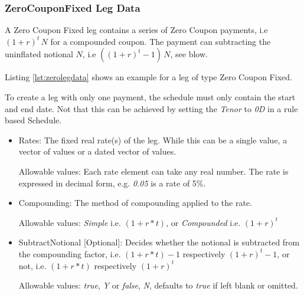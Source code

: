 \subsubsection{ZeroCouponFixed Leg Data}
\label{ss:zerolegdata}

A Zero Coupon Fixed leg contains a series of Zero Coupon payments, i.e $(1 + r)^t \,N$ for a compounded coupon. The payment can subtracting the uninflated notional $N$, i.e $((1 + r)^t-1) \,N$, see blow.

Listing \ref{lst:zerolegdata} shows an example for a leg of type Zero Coupon Fixed. 

To create a leg with only one payment, the schedule must only contain the start and end date. Not that this can be achieved by setting the \emph{Tenor} to \emph{0D} in a rule based Schedule. 

\begin{itemize}
\item Rates: The fixed real rate(s) of the leg. While this can be a single value, a vector of values or a dated vector of
  values. 
 
 Allowable values: Each rate element can take any  real number. The rate is
  expressed in decimal form, e.g. \emph{0.05} is a rate of 5\%.
\item Compounding: The method of compounding applied to the rate.

Allowable values: \emph{Simple} i.e. $(1 + r * t)$, or \emph{Compounded} i.e. $(1 + r)^t$

\item SubtractNotional [Optional]:  Decides whether the notional is
  subtracted from the compounding factor,  i.e. $(1 + r * t)  - 1$
  respectively  $(1 + r)^t - 1$, or not, i.e. $(1 + r * t)$  respectively  $(1 + r)^t$

Allowable values: \emph{true},  \emph{Y} or \emph{false}, \emph{N}, defaults to \emph{true} if left blank or omitted. 

\end{itemize}

